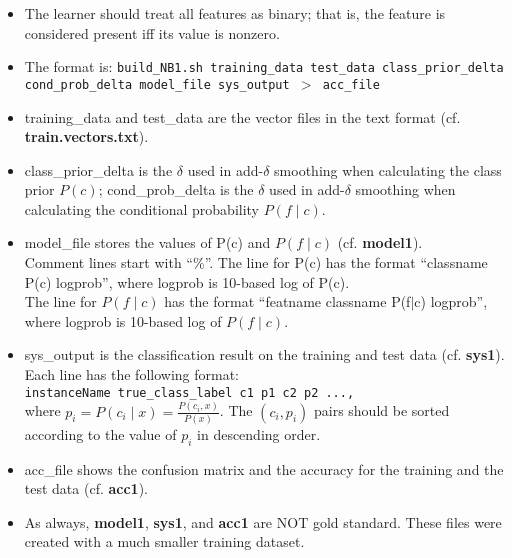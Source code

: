 \documentclass[11pt]{article}
\begin{document}
\begin{itemize} 
  \item The learner should treat all features as binary; that is,
        the feature is considered present iff its value is nonzero.

\item The format is: {\tt build\_NB1.sh training\_data test\_data  class\_prior\_delta cond\_prob\_delta model\_file sys\_output $>$ acc\_file }

  \item training\_data and test\_data are the vector files in the text format
        (cf. {\bf train.vectors.txt}).

  \item class\_prior\_delta is the $\delta$ used in add-$\delta$ smoothing 
         when calculating the class prior $P(c)$; 
         cond\_prob\_delta is the $\delta$ used in add-$\delta$ smoothing 
         when calculating the
         conditional probability $P(f \mid c)$.

  \item model\_file stores the values of 
        P(c) and $P(f \mid c)$ (cf. {\bf model1}). \\
        Comment lines start with ``\%''.
        The line for P(c) has the format 
        ``classname P(c) logprob'', where logprob is 10-based log of P(c). \\
        The line for $P(f \mid c)$ has the format 
        ``featname classname P(f$\mid$c) logprob'', 
         where logprob is 10-based log of $P(f \mid c)$. 
        
  \item sys\_output is the classification result on the training and
        test data (cf. {\bf sys1}). Each line has the following format:\\
	{\tt instanceName true\_class\_label c1 p1 c2 p2 ...,} \\
        where $p_i=P(c_i \mid x)=\frac{P(c_i, x)}{P(x)}$.
        The $(c_i, p_i)$ pairs should be sorted according to 
        the value of $p_i$ in descending order. 

  \item acc\_file shows the confusion matrix and the accuracy for
       the training and the test data (cf. {\bf acc1}). 

  \item As always, {\bf model1}, {\bf sys1}, and {\bf acc1}
        are NOT gold standard.
        These files were created with a much smaller training dataset.
\end{itemize}
\end{document}
